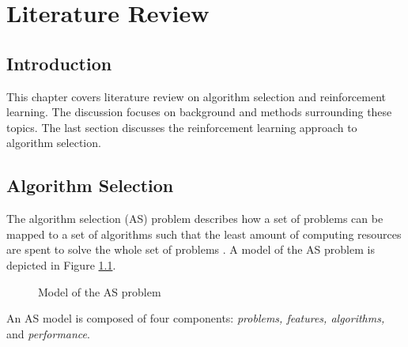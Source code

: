 \chapter{Literature Review}

\section{Introduction}
This chapter covers literature review on algorithm selection and reinforcement learning. The discussion focuses on background and methods surrounding these topics. The last section discusses the reinforcement learning approach to algorithm selection.

\section{Algorithm Selection}
The algorithm selection (AS) problem describes how a set of problems can be mapped to a set of algorithms such that the least amount of computing resources are spent to solve the whole set of problems \citep{rice1976algorithm}. A model of the AS problem is depicted in Figure \ref{fig:asmodel}.

\begin{figure}[H]
	\centering
	\caption{Model of the AS problem}
	\label{fig:asmodel}
\end{figure}

An AS model is composed of four components: \textit{problems, features, algorithms,} and \textit{performance}.

